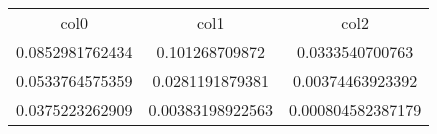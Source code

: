 \begin{table}
\begin{tabular}{ccc}
col0 & col1 & col2 \\
0.0852981762434 & 0.101268709872 & 0.0333540700763 \\
0.0533764575359 & 0.0281191879381 & 0.00374463923392 \\
0.0375223262909 & 0.00383198922563 & 0.000804582387179 \\
\end{tabular}
\end{table}
